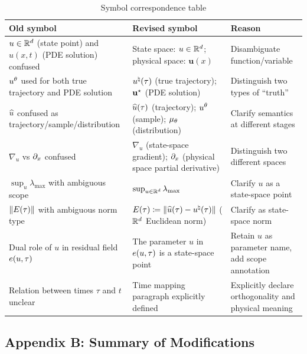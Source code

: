 \begin{table}[h]
\centering
\caption{Symbol correspondence table}
\begin{tabular}{lll}
\toprule
Old symbol & Revised symbol & Reason \\
\midrule
$u \in \mathbb{R}^d$ (state point) and $u(x,t)$ (PDE solution) confused & State space: $u \in \mathbb{R}^d$; physical space: $\mathbf{u}(x)$ & Disambiguate function/variable \\
$u^{\theta}$ used for both true trajectory and PDE solution & $u^{\natural}(\tau)$ (true trajectory); $\mathbf{u}^{\star}$ (PDE solution) & Distinguish two types of ``truth'' \\
$\widehat{u}$ confused as trajectory/sample/distribution & $\widehat{u}(\tau)$ (trajectory); $u^{\theta}$ (sample); $\mu_{\theta}$ (distribution) & Clarify semantics at different stages \\
$\nabla_u$ vs $\partial_{x}$ confused & $\nabla_u$ (state-space gradient); $\partial_{x}$ (physical space partial derivative) & Distinguish two different spaces \\
$\sup_u \lambda_{\max}$ with ambiguous scope & $\sup_{u \in \mathbb{R}^d} \lambda_{\max}$ & Clarify $u$ as a state-space point \\
$\lVert E(\tau) \rVert$ with ambiguous norm type & $E(\tau) \coloneqq \lVert \widehat{u}(\tau) - u^{\natural}(\tau) \rVert$ ($\mathbb{R}^d$ Euclidean norm) & Clarify as state-space norm \\
Dual role of $u$ in residual field $e(u,\tau)$ & The parameter $u$ in $e(u,\tau)$ is a state-space point & Retain $u$ as parameter name, add scope annotation \\
Relation between times $\tau$ and $t$ unclear & Time mapping paragraph explicitly defined & Explicitly declare orthogonality and physical meaning \\
\bottomrule
\end{tabular}
\end{table}

\subsection*{Appendix B: Summary of Modifications}

